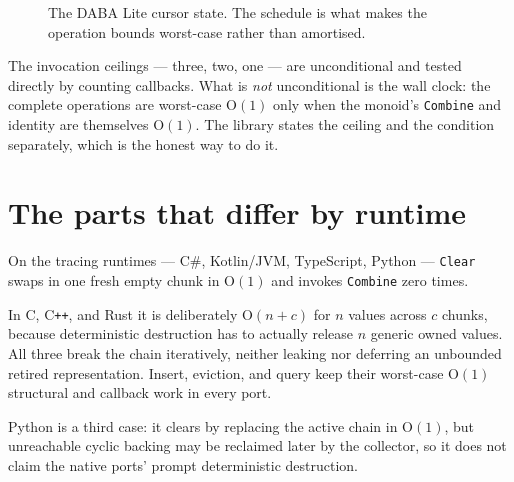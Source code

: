 \documentclass[11pt,twoside,openright]{book}
\newcommand{\code}[1]{\texorpdfstring{\textcolor{d7ink}{\texttt{#1}}}{#1}}
\newcommand{\bigoh}[1]{$\mathrm{O}(#1)$}
\begin{document}
\begin{figure}[htbp]
\centering
{}
\caption{The DABA Lite cursor state. The schedule is what makes the operation
bounds worst-case rather than amortised.}
\label{fig:daba}
\end{figure}

The invocation ceilings --- three, two, one --- are unconditional and tested
directly by counting callbacks. What is \emph{not} unconditional is the wall
clock: the complete operations are worst-case \bigoh{1} only when the monoid's
\code{Combine} and identity are themselves \bigoh{1}. The library states the
ceiling and the condition separately, which is the honest way to do it.

\section{The parts that differ by runtime}

\begin{caveatbox}[Clear is not \bigoh{1} everywhere]
On the tracing runtimes --- C\#, Kotlin/JVM, TypeScript, Python --- \code{Clear}
swaps in one fresh empty chunk in \bigoh{1} and invokes \code{Combine} zero
times.

In C, C\texttt{++}, and Rust it is deliberately \bigoh{n + c} for $n$ values
across $c$ chunks, because deterministic destruction has to actually release
$n$ generic owned values. All three break the chain iteratively, neither leaking
nor deferring an unbounded retired representation. Insert, eviction, and query
keep their worst-case \bigoh{1} structural and callback work in every port.

Python is a third case: it clears by replacing the active chain in \bigoh{1},
but unreachable cyclic backing may be reclaimed later by the collector, so it
does not claim the native ports' prompt deterministic destruction.
\end{caveatbox}
\end{document}
